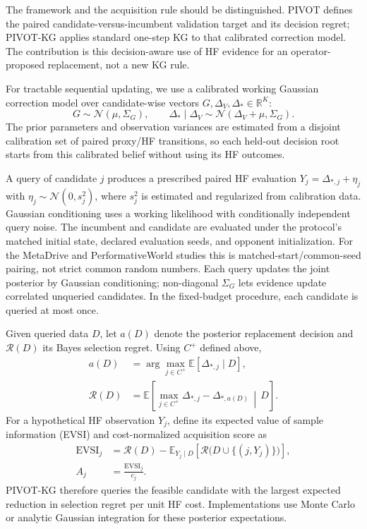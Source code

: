 \documentclass{article}
\newcommand{\E}{\mathbb{E}}
\newcommand{\R}{\mathbb{R}}
\begin{document}
The framework and the acquisition rule should be distinguished. PIVOT defines
the paired candidate-versus-incumbent validation target and its decision
regret; PIVOT-KG applies standard one-step KG to that calibrated correction
model. The contribution is this decision-aware use of HF evidence for an
operator-proposed replacement, not a new KG rule.

For tractable sequential updating, we use a calibrated working Gaussian correction
model over candidate-wise vectors $G,\Delta_V,\Delta_*\in\R^K$:
\[
  G\sim\mathcal N(\mu,\Sigma_G),
  \qquad
  \Delta_*\mid\Delta_V
  \sim\mathcal N(\Delta_V+\mu,\Sigma_G).
\]
The prior parameters and observation variances are estimated from a disjoint
calibration set of paired proxy/HF transitions, so each held-out decision root
starts from this calibrated belief without using its HF outcomes.

A query of candidate $j$ produces a prescribed paired HF evaluation
$Y_j=\Delta_{*,j}+\eta_j$ with $\eta_j\sim\mathcal N(0,s_j^2)$, where $s_j^2$
is estimated and regularized from calibration data. Gaussian conditioning
uses a working likelihood with conditionally independent query noise.
The incumbent and candidate are evaluated under the protocol's matched initial
state, declared evaluation seeds, and opponent initialization. For the
MetaDrive and PerformativeWorld studies this is matched-start/common-seed
pairing, not strict common random numbers.
Each query updates the joint posterior by Gaussian conditioning; non-diagonal
$\Sigma_G$ lets evidence update correlated unqueried candidates. In the
fixed-budget procedure, each candidate is queried at most once.

Given queried data $D$, let $a(D)$ denote the posterior replacement decision
and $\mathcal R(D)$ its Bayes selection regret. Using $C^+$ defined above,
\[
\begin{aligned}
  a(D)
  &=\arg\max_{j\in C^+}\E[\Delta_{*,j}\mid D],\\
  \mathcal R(D)
  &=\E\!\left[
      \max_{j\in C^+}\Delta_{*,j}
      -\Delta_{*,a(D)}
      \,\middle|\,D
    \right].
\end{aligned}
\]
For a hypothetical HF observation $Y_j$, define its expected value of sample
information (EVSI) and cost-normalized acquisition score as
\begin{equation}
\begin{aligned}
  \mathrm{EVSI}_j
  &=\mathcal R(D)
    -\E_{Y_j\mid D}\!\left[\mathcal R\bigl(D\cup\{(j,Y_j)\}\bigr)\right],\\
  A_j&=\frac{\mathrm{EVSI}_j}{c_j}.
\end{aligned}
  \label{eq:acquisition}
\end{equation}
PIVOT-KG therefore queries the feasible candidate with the largest expected
reduction in selection regret per unit HF cost. Implementations use Monte Carlo
or analytic Gaussian integration for these posterior expectations.
\end{document}
